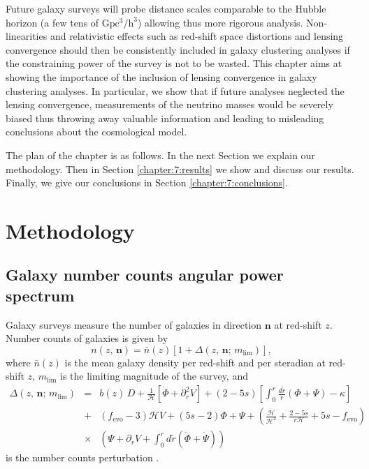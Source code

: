 Future galaxy surveys will probe distance scales comparable to the Hubble horizon (a few tens of $\mathrm{Gpc^3/h^3}$) allowing thus more rigorous analysis. Non-linearities and relativistic effects such as red-shift space distortions and lensing convergence should then be consistently included in galaxy clustering analyses if the constraining power of the survey is not to be wasted. This chapter aims at showing the importance of the inclusion of lensing convergence in galaxy clustering analyses. In particular, we show that if future analyses neglected the lensing convergence, measurements of the neutrino masses would be severely biased thus throwing away valuable information and leading to misleading conclusions about the cosmological model. 

The plan of the chapter is as follows. In the next Section we explain our methodology. Then in Section \ref{chapter:7:results} we show and discuss our results. Finally, we give our conclusions in Section \ref{chapter:7:conclusions}.
 
\section{Methodology}
\label{chapter:7:methodology}

\subsection{Galaxy number counts angular power spectrum}

Galaxy surveys measure the number of galaxies in direction $\mathbf{n}$ at red-shift $z$. Number counts of galaxies is given by 
\begin{equation}
\label{Eq:galaxy-number-counts}
n(z,\,\mathbf{n}) = \bar{n}(z) \left[ 1 + \Delta(z,\,\mathbf{n};\,m_{\mathrm{lim}}) \right],
\end{equation}  
where $\bar{n}(z)$ is the mean galaxy density per red-shift and per steradian at red-shift $z$, $m_{\mathrm{lim}}$ is the limiting magnitude of the survey, and 
\begin{eqnarray}
\label{Eq:galaxy-number-counts-perturbation}
\Delta(z,\,\mathbf{n};\,m_{\mathrm{lim}}) &=&  b(z)\,D + \frac{1}{\mathcal{H}}\left[ \dot{\Phi} + \partial_r^2 V \right] + (2 - 5 s) \left[ \int_0^r \frac{d\tilde{r}}{r}(\Phi + \Psi) - \kappa \right] \nonumber \\
&+&  (f_{\mathrm{evo}} - 3)\mathcal{H}V + (5s-2)\Phi + \Psi 
+ \left( \frac{\dot{\mathcal{H}}}{\mathcal{H}^2} + \frac{2 - 5s}{r\mathcal{H}} + 5s - f_{\mathrm{evo}} \right) \nonumber \\
&\times & \left( \Psi + \partial_rV + \int_0^r d\tilde{r}(\dot{\Phi} + \dot{\Psi}) \right) 
\end{eqnarray}
is the number counts perturbation .   

